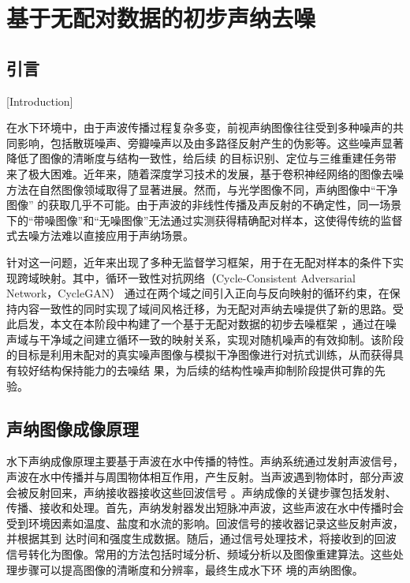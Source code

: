

\chapter{基于无配对数据的初步声纳去噪}

\section{引言}[Introduction]

在水下环境中，由于声波传播过程复杂多变，前视声纳图像往往受到多种噪声的共同影响，包括散斑噪声、旁瓣噪声以及由多路径反射产生的伪影等。这些噪声显著降低了图像的清晰度与结构一致性，给后续
的目标识别、定位与三维重建任务带来了极大困难。近年来，随着深度学习技术的发展，基于卷积神经网络的图像去噪方法在自然图像领域取得了显著进展。然而，与光学图像不同，声纳图像中“干净图像”
的获取几乎不可能。由于声波的非线性传播及声反射的不确定性，同一场景下的“带噪图像”和“无噪图像”无法通过实测获得精确配对样本，这使得传统的监督式去噪方法难以直接应用于声纳场景。

针对这一问题，近年来出现了多种无监督学习框架，用于在无配对样本的条件下实现跨域映射。其中，循环一致性对抗网络（Cycle-Consistent Adversarial Network，CycleGAN）\cite{zhu2017unpaired}
通过在两个域之间引入正向与反向映射的循环约束，在保持内容一致性的同时实现了域间风格迁移，为无配对声纳去噪提供了新的思路。受此启发，本文在本阶段中构建了一个基于无配对数据的初步去噪框架
，通过在噪声域与干净域之间建立循环一致的映射关系，实现对随机噪声的有效抑制。该阶段的目标是利用未配对的真实噪声图像与模拟干净图像进行对抗式训练，从而获得具有较好结构保持能力的去噪结
果，为后续的结构性噪声抑制阶段提供可靠的先验。

\section{声纳图像成像原理}

水下声纳成像原理主要基于声波在水中传播的特性。声纳系统通过发射声波信号，声波在水中传播并与周围物体相互作用，产生反射。当声波遇到物体时，部分声波会被反射回来，声纳接收器接收这些回波信号
。声纳成像的关键步骤包括发射、传播、接收和处理。首先，声纳发射器发出短脉冲声波，这些声波在水中传播时会受到环境因素如温度、盐度和水流的影响。回波信号的接收器记录这些反射声波，并根据其到
达时间和强度生成数据。随后，通过信号处理技术，将接收到的回波信号转化为图像。常用的方法包括时域分析、频域分析以及图像重建算法。这些处理步骤可以提高图像的清晰度和分辨率，最终生成水下环
境的声纳图像。

